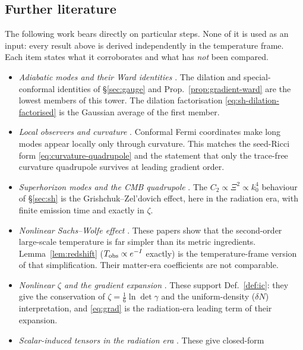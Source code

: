 \documentclass[11pt]{article}
\theoremstyle{definition}
\theoremstyle{remark}
\begin{document}
\subsection{Further literature}\label{sec:literature}
The following work bears directly on particular steps. None of it is used as an input: every
result above is derived independently in the temperature frame. Each item states what it
corroborates and what has \emph{not} been compared.
\begin{itemize}
\item \emph{Adiabatic modes and their Ward identities}
  \cite{Weinberg2003,HinterbichlerHuiKhoury,CreminelliNorenaSimonovic}. The dilation and
  special-conformal identities of \S\ref{sec:gauge} and Prop.~\ref{prop:gradient-ward} are the
  lowest members of this tower. The dilation factorisation \eqref{eq:sh-dilation-factorised} is
  the Gaussian average of the first member.
\item \emph{Local observers and curvature} \cite{PajerSchmidtZaldarriaga,DaiPajerSchmidt}.
  Conformal Fermi coordinates make long modes appear locally only through curvature. This
  matches the seed-Ricci form \eqref{eq:curvature-quadrupole} and the statement that only the
  trace-free curvature quadrupole survives at leading gradient order.
\item \emph{Superhorizon modes and the CMB quadrupole}
  \cite{GrishchukZeldovich,EKCsuperhorizon}. The $C_2\propto\Xi^2\propto k_0^4$ behaviour of
  \S\ref{sec:sh} is the Grishchuk--Zel'dovich effect, here in the radiation era, with finite
  emission time and exactly in $\zeta$.
\item \emph{Nonlinear Sachs--Wolfe effect} \cite{BartoloMatarreseRiotto2004,Boubekeur2009}.
  These papers show that the second-order large-scale temperature is far simpler than its
  metric ingredients. Lemma~\ref{lem:redshift} ($T_{\rm obs}\propto e^{-I}$ exactly) is the
  temperature-frame version of that simplification. Their matter-era coefficients are not
  comparable.
\item \emph{Nonlinear $\zeta$ and the gradient expansion}
  \cite{SalopekBond,LythMalikSasaki,LangloisVernizzi}. These support Def.~\ref{def:ic}: they
  give the conservation of $\zeta=\frac16\ln\det\gamma$ and the uniform-density ($\delta N$)
  interpretation, and \eqref{eq:grad} is the radiation-era leading term of their expansion.
\item \emph{Scalar-induced tensors in the radiation era}
  \cite{AnandaClarksonWands,KohriTerada,EspinosaRaccoRiotto}. These give closed-form

\end{itemize}
\end{document}
